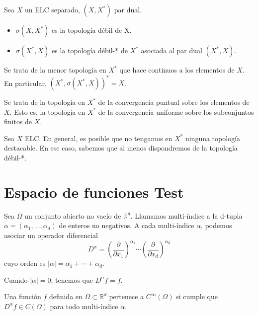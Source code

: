 \begin{definicion}

Sea $X$ un ELC separado, $(X,X^{*})$ par dual.
\begin{itemize}
	\item $\sigma (X,X^{*})$ es la topología débil de X.
	\item $\sigma (X^{*},X)$ es la topología débil-* de $X^{*}$ asociada al par dual $(X^{*},X)$.
\end{itemize}
\end{definicion}

\begin{observacion}
 Se trata de la menor topología en $X^{*}$ que hace continuos a los elementos de $X$. En particular, $(X^{*},\sigma (X^{*},X))^{*} = X$.
\end{observacion}

\begin{observacion}
Se trata de la topología en $X^{*}$ de la convergencia puntual sobre los elementos de $X$. Esto es, la topología en $X^{*}$ de la convergencia uniforme sobre los subconjuntos finitos de $X$.
\end{observacion}

\begin{observacion}
Sea $X$ ELC. En general, es posible que no tengamos en $X^{*}$ ninguna topología destacable. En ese caso, sabemos que al menos dispondremos de la topología débil-*.
\end{observacion}
\section{Espacio de funciones Test}
\begin{definicion}
Sea $\Omega$ un conjunto abierto no vacío de $\mathds{R}^{d}$. Llamamos multi-índice a la d-tupla  $\alpha = (\alpha_{1},\ldots,\alpha_{d})$ de enteros no negativos. A cada multi-índice $\alpha$, podemos asociar un operador diferencial
\begin{equation}
D^{\alpha} = 
\left(\frac{\partial}{\partial x_{1}}\right)^{\alpha_{1}}\cdots \left(\frac{\partial}{\partial x_{d}}\right)^{\alpha_{d}}
\end{equation}
cuyo orden es  $\vert\alpha\vert = \alpha_{1} + \dotsb + \alpha_{d}$.
\end{definicion}
\begin{observacion}
Cuando $\vert\alpha\vert = 0$, tenemos que $D^{\alpha}f=f$.
\end{observacion}

\begin{definicion}
Una función $f$ definida en $\Omega \subset \mathds{R}^{d}$ pertenece a $C^{\infty}(\Omega)$ si cumple que $D^{\alpha}f\in C(\Omega)$ para todo multi-índice $\alpha$.
\end{definicion}

